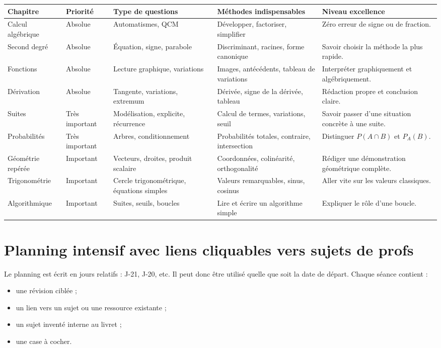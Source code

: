 \documentclass[11pt,a4paper]{article}
\begin{document}
\footnotesize
\begin{longtable}{|p{3.2cm}|p{2.4cm}|p{3.2cm}|p{4cm}|p{4cm}|}
\hline
\textbf{Chapitre} & \textbf{Priorité} & \textbf{Type de questions} & \textbf{Méthodes indispensables} & \textbf{Niveau excellence}\\
\hline
Calcul algébrique & Absolue & Automatismes, QCM & Développer, factoriser, simplifier & Zéro erreur de signe ou de fraction.\\
\hline
Second degré & Absolue & Équation, signe, parabole & Discriminant, racines, forme canonique & Savoir choisir la méthode la plus rapide.\\
\hline
Fonctions & Absolue & Lecture graphique, variations & Images, antécédents, tableau de variations & Interpréter graphiquement et algébriquement.\\
\hline
Dérivation & Absolue & Tangente, variations, extremum & Dérivée, signe de la dérivée, tableau & Rédaction propre et conclusion claire.\\
\hline
Suites & Très important & Modélisation, explicite, récurrence & Calcul de termes, variations, seuil & Savoir passer d'une situation concrète à une suite.\\
\hline
Probabilités & Très important & Arbres, conditionnement & Probabilités totales, contraire, intersection & Distinguer $P(A\cap B)$ et $P_A(B)$.\\
\hline
Géométrie repérée & Important & Vecteurs, droites, produit scalaire & Coordonnées, colinéarité, orthogonalité & Rédiger une démonstration géométrique complète.\\
\hline
Trigonométrie & Important & Cercle trigonométrique, équations simples & Valeurs remarquables, sinus, cosinus & Aller vite sur les valeurs classiques.\\
\hline
Algorithmique & Important & Suites, seuils, boucles & Lire et écrire un algorithme simple & Expliquer le rôle d'une boucle.\\
\hline
\end{longtable}
\normalsize

\section{Planning intensif avec liens cliquables vers sujets de profs}

\begin{alerte}
Le planning est écrit en jours relatifs : J-21, J-20, etc.  
Il peut donc être utilisé quelle que soit la date de départ.  
Chaque séance contient :
\begin{itemize}
  \item une révision ciblée ;
  \item un lien vers un sujet ou une ressource existante ;
  \item un sujet inventé interne au livret ;
  \item une case à cocher.
\end{itemize}
\end{alerte}
\end{document}
